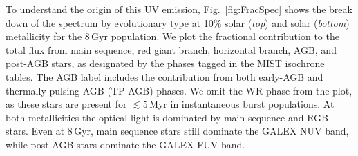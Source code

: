 \documentclass[preprint2]{aastex62}
\newcommand{\Myr}{$\,$Myr\xspace}
\newcommand{\Gyr}{$\,$Gyr\xspace}
\begin{document}
To understand the origin of this UV emission, Fig.~\ref{fig:FracSpec} shows the break down of the spectrum by evolutionary type at 10\% solar (\emph{top}) and solar (\emph{bottom}) metallicity for the 8\Gyr population. We plot the fractional contribution to the total flux from main sequence, red giant branch, horizontal branch, AGB, and post-AGB stars, as designated by the phases tagged in the MIST isochrone tables. The AGB label includes the contribution from both early-AGB and thermally pulsing-AGB (TP-AGB) phases. We omit the WR phase from the plot, as these stars are present for $\lesssim5$\Myr in instantaneous burst populations. At both metallicities the optical light is dominated by main sequence and RGB stars. Even at 8\Gyr, main sequence stars still dominate the GALEX NUV band, while post-AGB stars dominate the GALEX FUV band.
\end{document}
